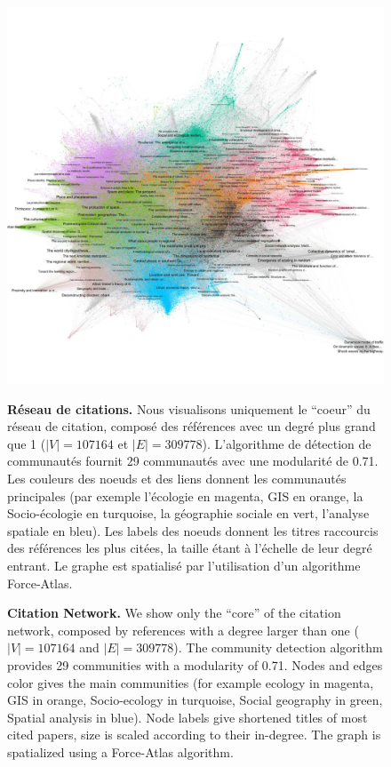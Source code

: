 \begin{figure}
\includegraphics[width=\linewidth]{Figures/Final/B-cybergeo-fig5.jpg}
\caption{\textbf{Citation Network.} We show only the ``core'' of the citation network, composed by references with a degree larger than one ($\left|V\right| = 107164$ and $\left|E\right| = 309778$). The community detection algorithm provides 29 communities with a modularity of 0.71. Nodes and edges color gives the main communities (for example ecology in magenta, GIS in orange, Socio-ecology in turquoise, Social geography in green, Spatial analysis in blue). Node labels give shortened titles of most cited papers, size is scaled according to their in-degree. The graph is spatialized using a Force-Atlas algorithm.\label{fig:cybergeo:fig5}}{\textbf{Réseau de citations.} Nous visualisons uniquement le ``coeur'' du réseau de citation, composé des références avec un degré plus grand que 1 ($\left|V\right| = 107164$ et $\left|E\right| = 309778$). L'algorithme de détection de communautés fournit 29 communautés avec une modularité de 0.71. Les couleurs des noeuds et des liens donnent les communautés principales (par exemple l'écologie en magenta, GIS en orange, la Socio-écologie en turquoise, la géographie sociale en vert, l'analyse spatiale en bleu). Les labels des noeuds donnent les titres raccourcis des références les plus citées, la taille étant à l'échelle de leur degré entrant. Le graphe est spatialisé par l'utilisation d'un algorithme Force-Atlas.\label{fig:cybergeo:fig5}}
\end{figure}


